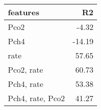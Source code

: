 \begin{longtable}{lr}
\hline
 features         &     R2 \\
\hline
 Pco2             &  -4.32 \\
 Pch4             & -14.19 \\
 rate             &  57.65 \\
 Pco2, rate       &  60.73 \\
 Pch4, rate       &  53.38 \\
 Pch4, rate, Pco2 &  41.27 \\
\hline
\end{longtable}
